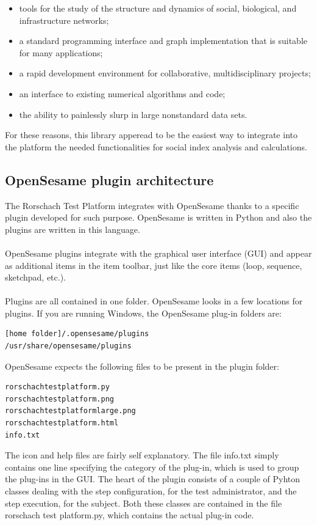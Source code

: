 \begin{itemize}
\item tools for the study of the structure and dynamics of social, biological, and infrastructure networks;
\item a standard programming interface and graph implementation that is suitable for many applications;
\item a rapid development environment for collaborative, multidisciplinary projects;
\item an interface to existing numerical algorithms and code;
\item the ability to painlessly slurp in large nonstandard data sets.
\end{itemize}

For these reasons, this library apperead to be the easiest way to integrate into the platform the needed functionalities for social index analysis and calculations.

\label{sec:opensesameplugin}
\subsection{OpenSesame plugin architecture}
The Rorschach Test Platform integrates with OpenSesame thanks to a specific plugin developed for such purpose.
OpenSesame is written in Python and also the plugins are written in this language.\\
\\
OpenSesame plugins integrate with the graphical user interface (GUI) and appear as additional items in the item toolbar, just like the core items
(loop, sequence, sketchpad, etc.).\\
\\

Plugins are all contained in one folder. OpenSesame looks in a few locations for plugins.
If you are running Windows, the OpenSesame plug-in folders are:

\begin{lstlisting}
[home folder]/.opensesame/plugins
/usr/share/opensesame/plugins
\end{lstlisting}

OpenSesame expects the following files to be present in the plugin folder:

\begin{lstlisting}
rorschachtestplatform.py
rorschachtestplatform.png
rorschachtestplatformlarge.png
rorschachtestplatform.html
info.txt
\end{lstlisting}

The icon and help files are fairly self explanatory. The file info.txt simply contains one line specifying the category of the plug-in, which is used to group the
plug-ins in the GUI.
The heart of the plugin consists of a couple of Pyhton classes dealing with the step configuration, for the test administrator, and the step execution, for the subject.
Both these classes are contained in the file rorschach test platform.py, which contains the actual plug-in code.

